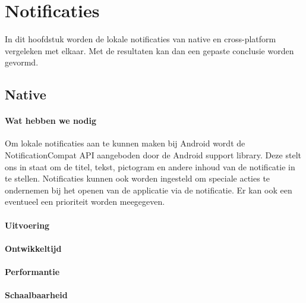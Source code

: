 
\chapter{Notificaties}%
\label{ch:notificaties}

In dit hoofdstuk worden de lokale notificaties van native en cross-platform vergeleken met elkaar. 
Met de resultaten kan dan een gepaste conclusie worden gevormd.

\section{Native}
\subsubsection{Wat hebben we nodig}
Om lokale notificaties aan te kunnen maken bij Android wordt de NotificationCompat API aangeboden 
door de Android support library. Deze stelt ons in staat om de titel, tekst, pictogram en andere inhoud van de 
notificatie in te stellen. Notificaties kunnen ook worden ingesteld om speciale acties te ondernemen bij het openen 
van de applicatie via de notificatie. Er kan ook een eventueel een prioriteit worden meegegeven.

\subsubsection{Uitvoering}



\subsubsection{Ontwikkeltijd}



\subsubsection{Performantie}



\subsubsection{Schaalbaarheid}

